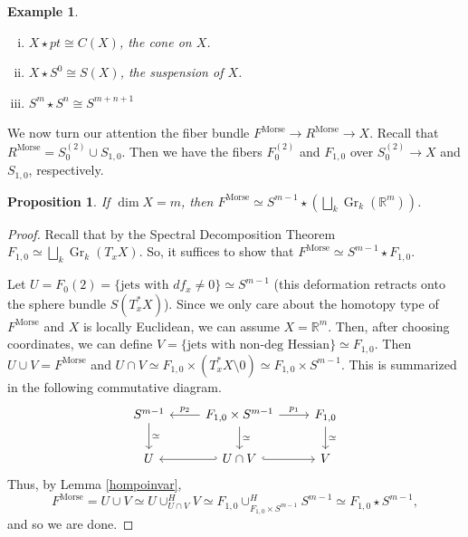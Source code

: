 \documentclass{article}
\newtheorem{proposition}[theorem]{Proposition}
\newtheorem{example}[theorem]{Example}
\newtheorem{proposed work}[theorem]{Proposed Work}
\DeclareMathOperator{\Morse}{Morse}
\DeclareMathOperator{\Gr}{Gr}
\begin{document}
\begin{example}
\begin{enumerate}[(i)]
\item $X \star pt \cong C(X)$, the cone on $X$.
\item $X \star S^0 \cong S(X)$, the suspension of $X$.
\item $S^m \star S^n \cong S^{m+n+1}$
\end{enumerate}
\end{example} 

We now turn our attention the fiber bundle $F^{\Morse} \to R^{\Morse} \to X$. Recall that $R^{\Morse} = S_0^{(2)} \cup S_{1,0}$. Then we have the fibers $F_0^{(2)}$ and $F_{1,0}$ over $S_0^{(2)} \to X$ and $S_{1,0}$, respectively.

\begin{proposition}
If $\dim X = m$, then $F^{\Morse} \simeq S^{m-1} \star \left( \bigsqcup_k \Gr_k(\mathbb{R}^m) \right)$.
\end{proposition}

\begin{proof}
Recall that by the Spectral Decomposition Theorem $F_{1,0} \simeq \bigsqcup_k \Gr_k(T_x X)$. So, it suffices to show that $F^{\Morse} \simeq S^{m-1} \star F_{1,0}$. 

Let $U = F_0{(2)} =  \{ \text{jets with } df_x \neq 0\} \simeq S^{m-1}$ (this deformation retracts onto the sphere bundle $S(T_x^* X)$). Since we only care about the homotopy type of $F^{\Morse}$ and $X$ is locally Euclidean, we can assume $X = \mathbb{R}^m$. Then, after choosing coordinates, we can define $V = \{ \text{jets with non-deg Hessian} \} \simeq F_{1,0}$.  Then $U \cup V = F^{\Morse}$ and $U \cap V \simeq F_{1,0} \times \left( T_x^* X \setminus 0 \right) \simeq F_{1,0} \times S^{m-1}$. This is summarized in the following commutative diagram.
\begin{equation*}
\begin{tikzcd}
S^{m-1} \arrow[d, "\simeq"] & F_{1,0} \times S^{m-1} \arrow[l,swap, "p_2"] \arrow[r, "p_1"] \arrow[d, "\simeq"] & F_{1,0} \arrow[d, "\simeq"] \\
U & U \cap V \arrow[l, hook'] \arrow[r, hook] & V
\end{tikzcd}
\end{equation*}
Thus, by Lemma \ref{hompoinvar}, 
\begin{equation*}
F^{\Morse} = U \cup V \simeq U \cup_{U \cap V}^H V \simeq F_{1,0} \cup_{F_{1,0} \times S^{m-1}}^H S^{m-1} \simeq F_{1,0} \star S^{m-1},
\end{equation*}
and so we are done.
\end{proof}
\end{document}
